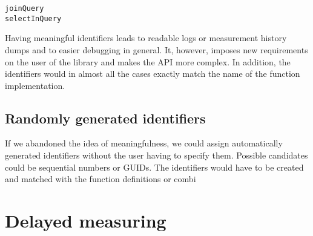 \begin{lstlisting}
joinQuery
selectInQuery
\end{lstlisting}

Having meaningful identifiers leads to readable logs or measurement history dumps and to easier debugging in general. It, however, imposes new requirements on the user of the library and makes the API more complex. In addition, the identifiers would in almost all the cases exactly match the name of the function implementation.

\subsection{Randomly generated identifiers}
If we abandoned the idea of meaningfulness, we could assign automatically generated identifiers without the user having to specify them. Possible candidates could be sequential numbers or GUIDs. The identifiers would have to be created and matched with the function definitions or combi


\section{Delayed measuring}


